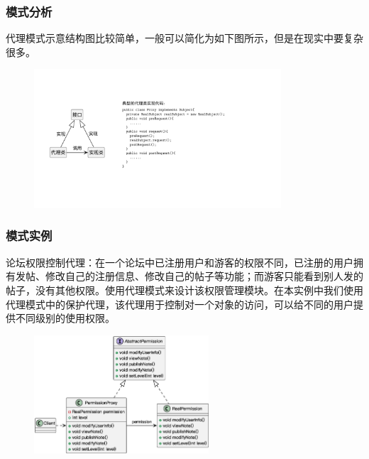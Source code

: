 \subsubsection{模式分析}
代理模式示意结构图比较简单，一般可以简化为如下图所示，但是在现实中要复杂很多。
\begin{figure}[H]
    \vspace{-0.5em}
	\centering
	\includegraphics[width=0.82\textwidth]{images/代理模式分析.pdf}
    \vspace{-1em}
\end{figure}

\subsubsection{模式实例}
论坛权限控制代理：在一个论坛中已注册用户和游客的权限不同，已注册的用户拥有发帖、修改自己的注册信息、修改自己的帖子等功能；而游客只能看到别人发的帖子，没有其他权限。使用代理模式来设计该权限管理模块。在本实例中我们使用代理模式中的保护代理，该代理用于控制对一个对象的访问，可以给不同的用户提供不同级别的使用权限。
\begin{figure}[H]
    \vspace{-0.5em}
	\centering
	\includegraphics[width=0.58\textwidth]{images/代理模式实例1.eps}
    \vspace{-1em}
\end{figure}

